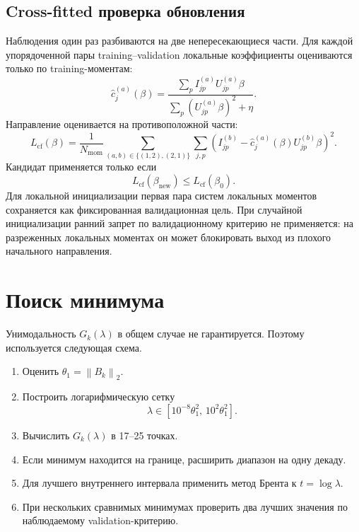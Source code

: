 \documentclass[11pt,a4paper]{article}
\newcommand{\norm}[1]{\left\lVert #1\right\rVert_2}
\begin{document}
\subsection{Cross-fitted проверка обновления}

Наблюдения один раз разбиваются на две непересекающиеся части.
Для каждой упорядоченной пары training--validation локальные коэффициенты
оцениваются только по training-моментам:
\[
    \widehat c_j^{(a)}(\beta)
    =
    \frac{
        \sum_p I_{jp}^{(a)}U_{jp}^{(a)}\beta
    }{
        \sum_p (U_{jp}^{(a)}\beta)^2+\eta
    }.
\]
Направление оценивается на противоположной части:
\begin{equation}
\label{eq:cross-fitted-moment-loss}
    L_{\mathrm{cf}}(\beta)
    =
    \frac{1}{N_{\mathrm{mom}}}
    \sum_{(a,b)\in\{(1,2),(2,1)\}}
    \sum_{j,p}
    \left(
        I_{jp}^{(b)}
        -
        \widehat c_j^{(a)}(\beta)U_{jp}^{(b)}\beta
    \right)^2.
\end{equation}
Кандидат применяется только если
\[
    L_{\mathrm{cf}}(\beta_{\mathrm{new}})
    \leq
    L_{\mathrm{cf}}(\beta_0).
\]
Для локальной инициализации первая пара систем локальных моментов сохраняется
как фиксированная валидационная цель. При случайной инициализации ранний
запрет по валидационному критерию не применяется: на разреженных локальных
моментах он может блокировать выход из плохого начального направления.

\section{Поиск минимума}

Унимодальность \(G_k(\lambda)\) в общем случае не гарантируется.
Поэтому используется следующая схема.

\begin{enumerate}[label=\arabic*.]
    \item Оценить \(\theta_1=\norm{B_k}\).
    \item Построить логарифмическую сетку
    \begin{equation}
    \label{eq:lambda-range}
        \lambda
        \in
        \left[
            10^{-8}\theta_1^2,\,
            10^{2}\theta_1^2
        \right].
    \end{equation}
    \item Вычислить \(G_k(\lambda)\) в 17--25 точках.
    \item Если минимум находится на границе, расширить диапазон на одну декаду.
    \item Для лучшего внутреннего интервала применить метод Брента к
    \(t=\log\lambda\).
    \item При нескольких сравнимых минимумах проверить два лучших значения
    по наблюдаемому validation-критерию.
\end{enumerate}
\end{document}
